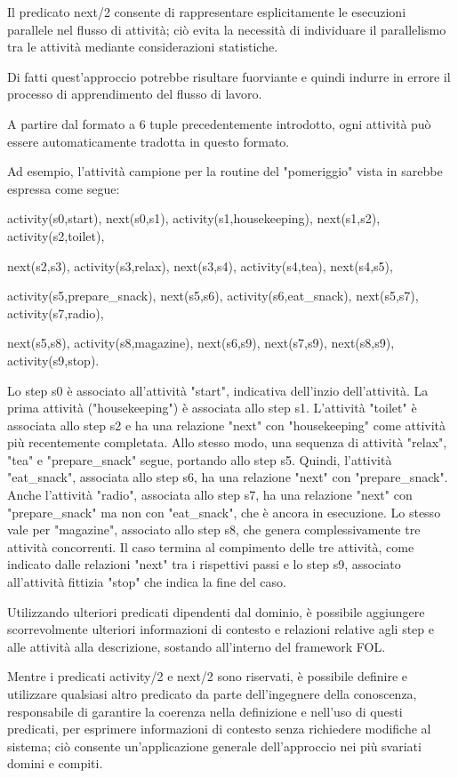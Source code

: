 Il predicato next/2 consente di rappresentare esplicitamente le esecuzioni parallele nel flusso di attività; ciò evita la necessità di individuare il parallelismo tra le attività mediante considerazioni statistiche. 

Di fatti quest'approccio potrebbe risultare fuorviante e quindi indurre in errore il processo di apprendimento del flusso di lavoro. 

A partire dal formato a 6 tuple precedentemente introdotto, ogni attività può essere automaticamente tradotta in questo formato.

Ad esempio, l’attività campione per la routine del "pomeriggio" vista in \cite{IncrLearnDailyRoutWorkflowSmartHomeEnvir} sarebbe espressa come segue:

activity(s0,start), next(s0,s1), activity(s1,housekeeping), next(s1,s2), activity(s2,toilet),

next(s2,s3), activity(s3,relax), next(s3,s4), activity(s4,tea), next(s4,s5),

activity(s5,prepare\_snack), next(s5,s6), activity(s6,eat\_snack), next(s5,s7), activity(s7,radio),

next(s5,s8), activity(s8,magazine), next(s6,s9), next(s7,s9), next(s8,s9), activity(s9,stop).

Lo step s0 è associato all'attività "start", indicativa dell'inzio dell’attività. La prima attività ("housekeeping") è associata allo step s1. L'attività "toilet" è associata allo step s2 e ha una relazione "next" con "housekeeping" come attività più recentemente completata. Allo stesso modo, una sequenza di attività "relax", "tea" e "prepare\_snack" segue, portando allo step s5. Quindi, l'attività "eat\_snack", associata allo step s6, ha una relazione "next" con "prepare\_snack". Anche l'attività "radio", associata allo step s7, ha una relazione "next" con "prepare\_snack" ma non con "eat\_snack", che è ancora in esecuzione. Lo stesso vale per "magazine", associato allo step s8, che genera complessivamente tre attività concorrenti. Il caso termina al compimento delle tre attività, come indicato dalle relazioni "next" tra i rispettivi passi e lo step s9, associato all'attività fittizia "stop" che indica la fine del caso.

Utilizzando ulteriori predicati dipendenti dal dominio, è possibile aggiungere scorrevolmente ulteriori informazioni di contesto e relazioni relative agli step e alle attività alla descrizione, sostando all'interno del framework FOL. 

Mentre i predicati activity/2 e next/2 sono riservati, è possibile definire e utilizzare qualsiasi altro predicato da parte dell'ingegnere della conoscenza, responsabile di garantire la coerenza nella definizione e nell'uso di questi predicati, per esprimere informazioni di contesto senza richiedere modifiche al sistema; ciò consente un'applicazione generale dell'approccio nei più svariati domini e compiti. 

